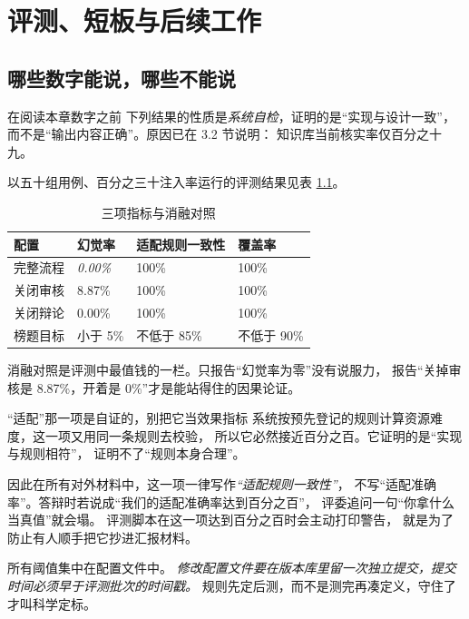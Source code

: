 \chapter{评测、短板与后续工作}

\section{哪些数字能说，哪些不能说}

\begin{keynote}{在阅读本章数字之前}
下列结果的性质是\emph{系统自检}，证明的是“实现与设计一致”，
而不是“输出内容正确”。原因已在 3.2 节说明：
知识库当前核实率仅百分之十九。
\end{keynote}

以五十组用例、百分之三十注入率运行的评测结果见表 \ref{tab:metrics}。

\begin{table}[htbp]\centering\small
\caption{三项指标与消融对照}\label{tab:metrics}
\begin{tabular}{@{}p{2.8cm}p{2.2cm}p{3cm}p{2.2cm}@{}}
\toprule
配置 & 幻觉率 & 适配规则一致性 & 覆盖率 \\
\midrule
完整流程 & \emph{0.00\%} & 100\% & 100\% \\
关闭审核 & 8.87\% & 100\% & 100\% \\
关闭辩论 & 0.00\% & 100\% & 100\% \\
榜题目标 & 小于 5\% & 不低于 85\% & 不低于 90\% \\
\bottomrule
\end{tabular}
\end{table}

消融对照是评测中最值钱的一栏。只报告“幻觉率为零”没有说服力，
报告“关掉审核是 8.87\%，开着是 0\%”才是能站得住的因果论证。

\begin{keynote}{“适配”那一项是自证的，别把它当效果指标}
系统按预先登记的规则计算资源难度，这一项又用同一条规则去校验，
所以它必然接近百分之百。它证明的是“实现与规则相符”，
证明不了“规则本身合理”。

因此在所有对外材料中，这一项一律写作\emph{“适配规则一致性”}，
不写“适配准确率”。答辩时若说成“我们的适配准确率达到百分之百”，
评委追问一句“你拿什么当真值”就会塌。
评测脚本在这一项达到百分之百时会主动打印警告，
就是为了防止有人顺手把它抄进汇报材料。
\end{keynote}

所有阈值集中在配置文件中。
\emph{修改配置文件要在版本库里留一次独立提交，提交时间必须早于评测批次的时间戳。}
规则先定后测，而不是测完再凑定义，守住了才叫科学定标。

